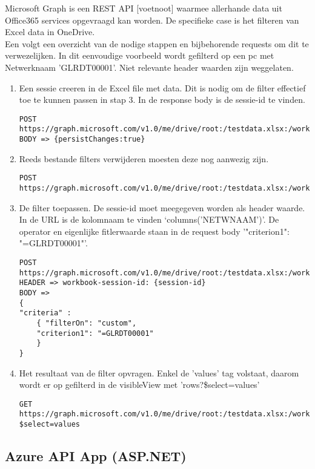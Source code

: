 Microsoft Graph is een REST API [voetnoot] waarmee allerhande data uit Office365 services opgevraagd kan worden. De specifieke case is het filteren van Excel data in OneDrive.\\
Een volgt een overzicht van de nodige stappen en bijbehorende requests om dit te verwezelijken.
In dit eenvoudige voorbeeld wordt gefilterd op een pc met Netwerknaam 'GLRDT00001'. Niet relevante header waarden zijn weggelaten.
\begin{enumerate}
    \item Een sessie creeren in de Excel file met data. Dit is nodig om de filter effectief toe te kunnen passen in stap 3. In de response body is de sessie-id te vinden.
\begin{lstlisting}
POST https://graph.microsoft.com/v1.0/me/drive/root:/testdata.xlsx:/workbook/createsession
BODY => {persistChanges:true}
\end{lstlisting}
    \item Reeds bestande filters verwijderen moesten deze nog aanwezig zijn.
\begin{lstlisting}
POST https://graph.microsoft.com/v1.0/me/drive/root:/testdata.xlsx:/workbook/worksheets('Blad1')/tables('tabel1')/clearFilters
\end{lstlisting}
    \item De filter toepassen. De sessie-id moet meegegeven worden als header waarde. In de URL is de kolomnaam te vinden `columns('NETWNAAM')'. De operator en eigenlijke fitlerwaarde staan in de request body '"criterion1": "=GLRDT00001"'.
\begin{lstlisting}
POST https://graph.microsoft.com/v1.0/me/drive/root:/testdata.xlsx:/workbook/worksheets('Blad1')/tables('tabel1')/columns('NETWNAAM')/filter/apply
HEADER => workbook-session-id: {session-id}
BODY => 
{
"criteria" : 
    { "filterOn": "custom",
    "criterion1": "=GLRDT00001"
    }
}
\end{lstlisting}
    \item Het resultaat van de filter opvragen. Enkel de 'values' tag volstaat, daarom wordt er op gefilterd in de visibleView met 'rows?\$select=values'
\begin{lstlisting}
GET https://graph.microsoft.com/v1.0/me/drive/root:/testdata.xlsx:/workbook/worksheets('Blad1')/tables('tabel1')/range/visibleView/rows?$select=values
\end{lstlisting}
\end{enumerate}


\subsection{Azure API App (ASP.NET)}

